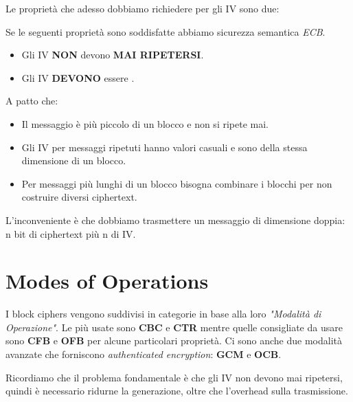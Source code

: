 Le proprietà che adesso dobbiamo richiedere per gli IV sono due:
\begin{theorem}
Se le seguenti proprietà sono soddisfatte abbiamo sicurezza semantica \textit{ECB}.
\begin{property}
\begin{itemize}
    \item Gli IV \textbf{NON} devono \textbf{MAI RIPETERSI}.
    \item Gli IV \textbf{DEVONO} essere .
\end{itemize}
\end{property}
A patto che:
\begin{itemize}
    \item Il messaggio è più piccolo di un blocco e non si ripete mai.
    \item Gli IV per messaggi ripetuti hanno valori casuali e sono della stessa dimensione di un blocco.
    \item Per messaggi più lunghi di un blocco bisogna combinare i blocchi per non costruire diversi ciphertext.
\end{itemize}
\begin{remark}
L'inconveniente è che dobbiamo trasmettere un messaggio di dimensione doppia: n bit di ciphertext più n di IV. 
\end{remark}
\end{theorem}
\section{Modes of Operations}
I block ciphers vengono suddivisi in categorie in base alla loro \textit{"Modalità di Operazione"}. Le più usate sono \textbf{CBC} e \textbf{CTR} mentre quelle consigliate da usare sono \textbf{CFB} e \textbf{OFB} per alcune particolari proprietà. Ci sono anche due modalità avanzate che forniscono \textit{authenticated encryption}: \textbf{GCM} e \textbf{OCB}.
\begin{note}
Ricordiamo che il problema fondamentale è che gli IV non devono mai ripetersi, quindi è necessario ridurne la generazione, oltre che l'overhead sulla trasmissione.
\end{note}
\pagebreak
